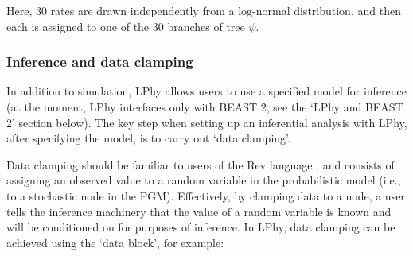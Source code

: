 \documentclass[10pt,letterpaper,table]{article}
\theoremstyle{definition}
\begin{document}
Here, 30 rates are drawn independently from a log-normal distribution, and then each is assigned to one of the 30 branches of tree $\psi$.

\subsubsection{Inference and data clamping}
\label{sec:dataclamping}
In addition to simulation, LPhy allows users to use a specified model for inference (at the moment, LPhy interfaces only with BEAST 2, see the `LPhy and BEAST 2' section below). The key step when setting up an inferential analysis with LPhy, after specifying the model, is to carry out `data clamping'.

Data clamping should be familiar to users of the Rev language \cite{revbayes}, and consists of assigning an observed value to a random variable in the probabilistic model (i.e., to a stochastic node in the PGM). Effectively, by clamping data to a node, a user tells the inference machinery that the value of a random variable is known and will be conditioned on for purposes of inference. In LPhy, data clamping can be achieved using the `data block', for example:
\end{document}
